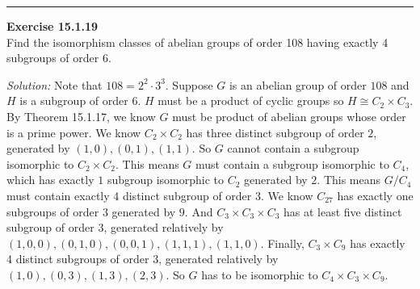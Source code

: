 \documentclass[a4paper, 12pt]{article}
\newenvironment{problem}[2][Exercise]
    { \begin{mdframed}[backgroundcolor=gray!20] \textbf{#1 #2} \\}
    {  \end{mdframed}}
\newenvironment{solution}
    {\textit{Solution:}}
    {}
\begin{document}
\noindent\rule{7in}{2.8pt}
\begin{problem}{15.1.19}
Find the isomorphism classes of abelian groups of order 108 having exactly 4 subgroups of order \(6\).
\end{problem}
\begin{solution}
Note that \(108=2^2\cdot 3^3\). Suppose \(G\) is an abelian group of order \(108\) and \(H\) is a subgroup of order \(6\). \(H\) must be a product of cyclic groups so \(H\cong C_2\times C_3\). By Theorem 15.1.17, we know 
\(G\) must be product of abelian groups whose order is a prime power. We know \(C_2\times C_2\) has three distinct subgroup of order \(2\), generated by \((1,0),(0,1),(1,1)\). So \(G\) cannot contain a subgroup isomorphic to 
\(C_2\times C_2\). This means \(G\) must contain a subgroup isomorphic to \(C_4\), which has exactly \(1\) subgroup isomorphic to \(C_2\) generated by \(2\). This means \(G/C_4\) must contain exactly 4 distinct subgroup of order \(3\). 
We know \(C_{27}\) has exactly one subgroups of order \(3\) generated by \(9\). And \(C_3\times C_3\times C_3\) has at least five distinct subgroup of order 3, generated relatively by \((1,0,0),(0,1,0),(0,0,1),(1,1,1),(1,1,0)\). Finally, \(C_3\times C_9\) 
has exactly 4 distinct subgroups of order 3, generated relatively by \((1,0),(0,3),(1,3),(2,3)\). So \(G\) has to be isomorphic to \(C_4\times C_3\times C_9\).
\end{solution}
\end{document}
